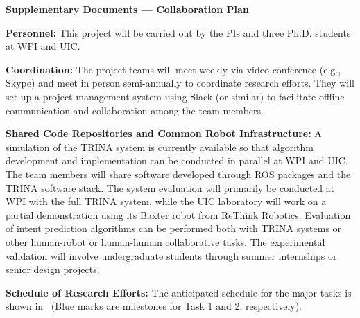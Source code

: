 \pagebreak

\begin{center}
	{\Large \bf Supplementary Documents --- Collaboration Plan}\\
\end{center}

\vspace{0.5em}




\noindent
{\bf Personnel:} 
This project will be carried out by the PIs and three Ph.D. students at WPI and UIC. 

\bigskip 

\noindent
{\bf Coordination:}
The project teams will meet weekly via video conference (e.g., Skype) and meet in person semi-annually to coordinate research efforts. They will set up a project management system using Slack (or similar) to facilitate offline communication and collaboration among the team members.

\bigskip

\noindent
{\bf Shared Code Repositories and Common Robot Infrastructure:}
A simulation of the TRINA system is currently available so that algorithm development and implementation can be conducted in parallel at WPI and UIC. The team members will share software developed through ROS packages and the TRINA software stack. The system evaluation will primarily be conducted at WPI with the full TRINA system, while the UIC laboratory will work on a partial demonstration using its Baxter robot from ReThink Robotics. Evaluation of intent prediction algorithms can be performed both with TRINA systems or other human-robot or human-human collaborative tasks.  The experimental validation will involve undergraduate students through summer internships or senior design projects. 

\bigskip

\noindent
{\bf Schedule of Research Efforts:}
The anticipated schedule for the major tasks is shown in~ (Blue marks are milestones for Task 1 and 2, respectively).

